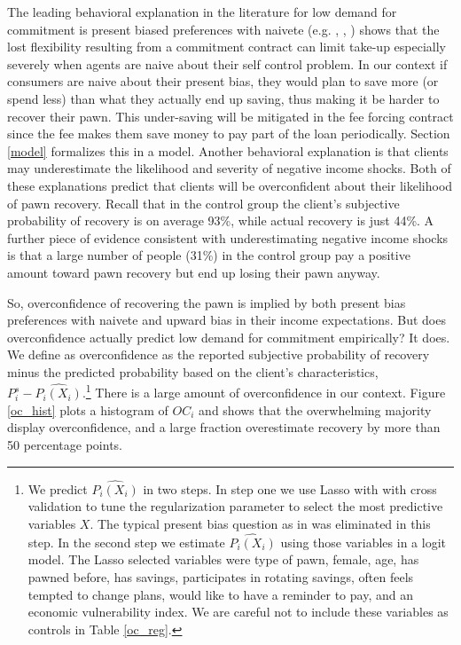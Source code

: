 \documentclass[oneside,11pt]{article}
\begin{document}
The leading behavioral explanation in the literature for low demand for commitment is present biased preferences with naivete (e.g. \cite{Rabin2018}, \cite{John}, \cite{Laibson2018})  \cite{Laibson2015} shows that the lost flexibility resulting from a commitment contract can limit take-up especially severely when agents are naive about their self control problem. In our context if consumers are naive about their present bias, they would plan to save more (or spend less) than what they actually end up saving, thus making it be harder to recover their pawn. This under-saving will be mitigated in the fee forcing contract since the fee makes them save money to pay part of the loan periodically. Section \ref{model} formalizes this in a model. Another behavioral explanation is that clients may underestimate the likelihood and severity of negative income shocks. Both of these explanations predict that clients will be overconfident about their likelihood of pawn recovery. Recall that in the control group the client's subjective probability of recovery is on average 93\%, while actual recovery is just 44\%. A further piece of evidence consistent with underestimating negative income shocks is that a large number of people (31\%) in the control group pay a positive amount toward pawn recovery but end up losing their pawn anyway.

So, overconfidence of recovering the pawn is implied by both present bias preferences with naivete and upward bias in their income expectations. But does overconfidence actually predict low demand for commitment empirically? It does. We define as overconfidence as the reported subjective probability of recovery minus the predicted probability based on the client's characteristics, $P^s_i-\widehat{P_i(X_i)}$.\footnote{We predict $\widehat{P_i(X_i)}$ in two steps. In step one we use Lasso with with cross validation to tune the regularization parameter to select the most predictive variables $X$. The typical present bias question as in \cite{Ashraf} was eliminated in this step. In the second step we estimate $\widehat{P_i(X_i)}$ using those variables in a logit model. The Lasso selected variables were type of pawn, female, age, has pawned before, has savings, participates in rotating savings, often feels tempted to change plans, would like to have a reminder to pay, and an economic vulnerability index. We are careful not to include these variables as controls in Table  \ref{oc_reg}.} There is a large amount of overconfidence in our context. Figure \ref{oc_hist} plots a histogram of $OC_i$ and shows that the overwhelming majority display overconfidence, and a large fraction overestimate recovery by more than 50 percentage points.
\end{document}
